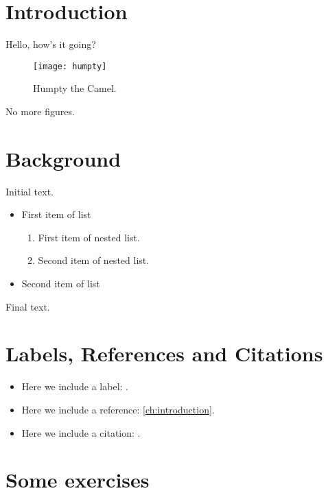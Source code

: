 \documentclass{camel}
\begin{document}
\chapter{Introduction}\label{ch:intro}

Hello, how's it going?
\begin{figure}
\centering
\texttt{[image: humpty]}
\caption{Humpty the Camel.}
\label{humpty-the-camel}
\end{figure}
No more figures.

\chapter{Background}\label{ch:background}

Initial text.
\begin{itemize}
\item First item of list
\begin{enumerate}
\item First item of nested list.
\item Second item of nested list.
\end{enumerate}
\item Second item of list
\end{itemize}
Final text.

\chapter{Labels, References and Citations}

\begin{itemize}
\item Here we include a label: \label{ch:introduction}.
\item Here we include a reference: \ref{ch:introduction}.
\item Here we include a citation: \cite{evans02}.
\end{itemize}

\chapter{Some exercises}\label{ch:exercises}
\end{document}
